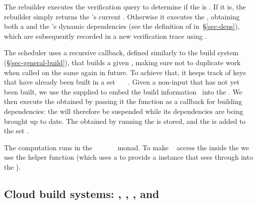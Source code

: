 The rebuilder executes the verification query  to determine if the
 is . If it is, the rebuilder simply returns the 's
current . Otherwise it executes the , obtaining both a
 and the 's dynamic dependencies  (see the
definition of  in~\S\ref{sec-deps}), which are subsequently recorded
in a new verification trace using .

The  scheduler uses a recursive  callback, defined
similarly to the  build system (\S\ref{sec-general-build}), that builds
a given , making sure not to duplicate work when called on the same
 again in future. To achieve that, it keeps track of keys that have
already been built in a set ~\hs{::}~~. Given a non-input
 that has not yet been built, we use the supplied  to
embed the build information~ into the . We then execute the
obtained  by passing it the  function as a callback for
building dependencies: the  will therefore be suspended while its
dependencies are being brought up to date. The  obtained by running
the  is stored, and the  is added to the set .

The  computation runs in the
~~~~~~ monad. To make
~ access the  inside the  we use the helper
function  (which uses a  to provide a 
instance that sees through into the ).

\subsection{Cloud build systems: \Bazel, \CloudBuild, \Cloud \Shake, \Buck and \Nix}
\label{sec-implementation-cloud}

